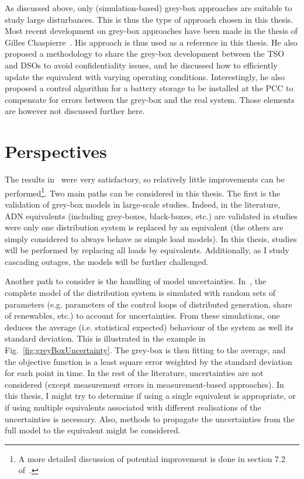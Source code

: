 As discussed above, only (simulation-based) grey-box approaches are suitable to study large disturbances. This is thus the type of approach chosen in this thesis. Most recent development on grey-box approaches have been made in the thesis of Gilles Chaspierre~\cite{ChaspierreThesis, ChaspierrePaper}. His approach is thus used as a reference in this thesis. He also proposed a methodology to share the grey-box development between the TSO and DSOs to avoid confidentiality issues, and he discussed how to efficiently update the equivalent with varying operating conditions. Interestingly, he also proposed a control algorithm for a battery storage to be installed at the PCC to compensate for errors between the grey-box and the real system. Those elements are however not discussed further here.


\section{Perspectives}
\label{sec:loadPerspectives}

The results in~\cite{ChaspierreThesis} were very satisfactory, so relatively little improvements can be performed\footnote{A more detailed discussion of potential improvement is done in section 7.2 of~\cite{ChaspierreThesis}.}. Two main paths can be considered in this thesis. The first is the validation of grey-box models in large-scale studies. Indeed, in the literature, ADN equivalents (including grey-boxes, black-boxes, etc.) are validated in studies were only one distribution system is replaced by an equivalent (the others are simply considered to always behave as simple load models). In this thesis, studies will be performed by replacing all loads by equivalents. Additionally, as I study cascading outages, the models will be further challenged.

Another path to consider is the handling of model uncertainties. In~\cite{ChaspierreThesis}, the complete model of the distribution system is simulated with random sets of parameters (e.g. parameters of the control loops of distributed generation, share of renewables, etc.) to account for uncertainties. From these simulations, one deduces the average (i.e. statistical expected) behaviour of the system as well its standard deviation. This is illustrated in the example in Fig.~\ref{fig:greyBoxUncertainty}. The grey-box is then fitting to the average, and the objective function is a least square error weighted by the standard deviation for each point in time. In the rest of the literature, uncertainties are not considered (except measurement errors in measurement-based approaches). In this thesis, I might try to determine if using a single equivalent is appropriate, or if using multiple equivalents associated with different realisations of the uncertainties is necessary. Also, methods to propagate the uncertainties from the full model to the equivalent might be considered. %

